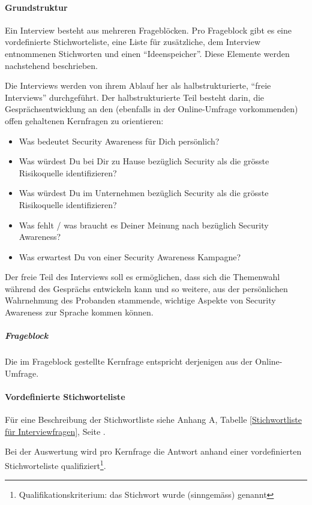 \documentclass[../../main.tex]{subfiles}
\begin{document}
\paragraph*{Grundstruktur}\mbox{}

\begin{sloppypar}
Ein Interview besteht aus mehreren Frageblöcken. Pro Frageblock gibt es eine vordefinierte Stichworteliste, eine Liste für zusätzliche, dem Interview entnommenen Stichworten und einen "`Ideenspeicher"'. Diese Elemente werden nachstehend beschrieben.

Die Interviews werden von ihrem Ablauf her als halbstrukturierte, "`freie Interviews"' durchgeführt. Der halbstrukturierte Teil besteht darin, die Gesprächsentwicklung an den (ebenfalls in der Online-Umfrage vorkommenden) offen gehaltenen Kernfragen zu orientieren:

\begin{itemize}
  \item Was bedeutet Security Awareness für Dich persönlich?
  \item Was würdest Du bei Dir zu Hause bezüglich Security als die grösste Risikoquelle identifizieren? 
  \item Was würdest Du im Unternehmen bezüglich Security als die grösste Risikoquelle identifizieren?
  \item Was fehlt / was braucht es Deiner Meinung nach bezüglich Security Awareness?
  \item Was erwartest Du von einer Security Awareness Kampagne?
\end{itemize}

Der freie Teil des Interviews soll es ermöglichen, dass sich die Themenwahl während des Gesprächs entwickeln kann und so weitere, aus der persönlichen Wahrnehmung des Probanden stammende, wichtige Aspekte von Security Awareness zur Sprache kommen können. 
\end{sloppypar}

\subparagraph*{Frageblock}\mbox{}

\begin{sloppypar}
Die im Frageblock gestellte Kernfrage entspricht derjenigen aus der Online-Umfrage.
\end{sloppypar}

\paragraph*{Vordefinierte Stichworteliste}\mbox{}

\begin{sloppypar}
Für eine Beschreibung der Stichwortliste  siehe Anhang A, Tabelle \ref{Stichwortliste für Interviewfragen}, Seite \pageref{Stichwortliste für Interviewfragen}.

Bei der Auswertung wird pro Kernfrage die Antwort anhand einer vordefinierten Stichworteliste qualifiziert\footnote{Qualifikationskriterium: das Stichwort wurde (sinngemäss) genannt}.
\end{sloppypar}
\end{document}
